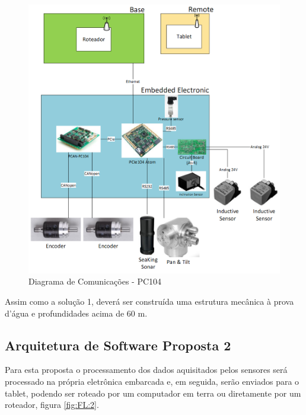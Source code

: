 \begin{figure}[H]
    \centering
    \includegraphics[width=1\columnwidth]{figs/eletronica/4.png}
    \caption{Diagrama de Comunicações - PC104}
    \label{pc104}
\end{figure} 
 
Assim como a solução 1, deverá ser construída uma estrutura mecânica à prova
d’água e profundidades acima de 60 m.

\subsection{Arquitetura de Software Proposta 2}

Para esta proposta o processamento dos dados aquisitados pelos sensores será
processado na própria eletrônica embarcada e, em seguida,
 serão enviados para o tablet, podendo ser roteado por um computador em terra ou
 diretamente por um roteador, figura \ref{fig:FL:2}.
 


